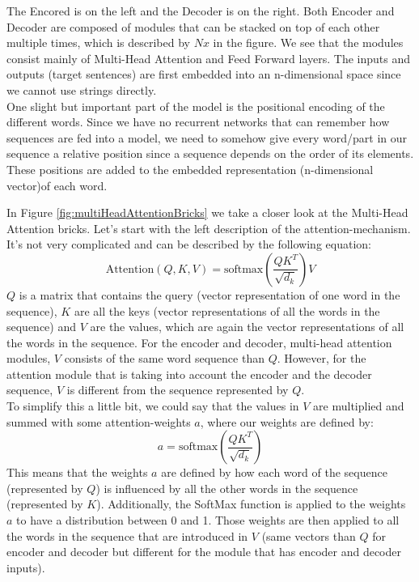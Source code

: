 The Encored is on the left and the Decoder is on the right. Both Encoder and Decoder are composed of modules that can be stacked on top of each other multiple times, which is described by $Nx$ in the figure. We see that the modules consist mainly of Multi-Head Attention and Feed Forward layers. The inputs and outputs (target sentences) are first embedded into an n-dimensional space since we cannot use strings directly. \\ One slight but important part of the model is the positional encoding of the different words. Since we have no recurrent networks that can remember how sequences are fed into a model, we need to somehow give every word/part in our sequence a relative position since a sequence depends on the order of its elements. These positions are added to the embedded representation (n-dimensional vector)of each word. \newline

In Figure \ref{fig:multiHeadAttentionBricks} we take a closer look at the Multi-Head Attention bricks. Let's start with the left description of the attention-mechanism. It's not very complicated and can be described by the following equation:
\begin{equation}
    \text{Attention}(Q,K,V) = \text{softmax}(\frac{QK^T}{\sqrt{d_k}}) V
\end{equation}
$Q$ is a matrix that contains the query (vector representation of one word in the sequence), $K$ are all the keys (vector representations of all the words in the sequence) and $V$ are the values, which are again the vector representations of all the words in the sequence. For the encoder and decoder, multi-head attention modules, $V$ consists of the same word sequence than $Q$. However, for the attention module that is taking into account the encoder and the decoder sequence, $V$ is different from the sequence represented by $Q$.\\ To simplify this a little bit, we could say that the values in $V$ are multiplied and summed with some attention-weights $a$, where our weights are defined by:
\begin{equation}
    a = \text{softmax}(\frac{QK^T}{\sqrt{d_k}})
\end{equation}
This means that the weights $a$ are defined by how each word of the sequence (represented by $Q$) is influenced by all the other words in the sequence (represented by $K$). Additionally, the SoftMax function is applied to the weights $a$ to have a distribution between 0 and 1. Those weights are then applied to all the words in the sequence that are introduced in $V$ (same vectors than $Q$ for encoder and decoder but different for the module that has encoder and decoder inputs). \newline

